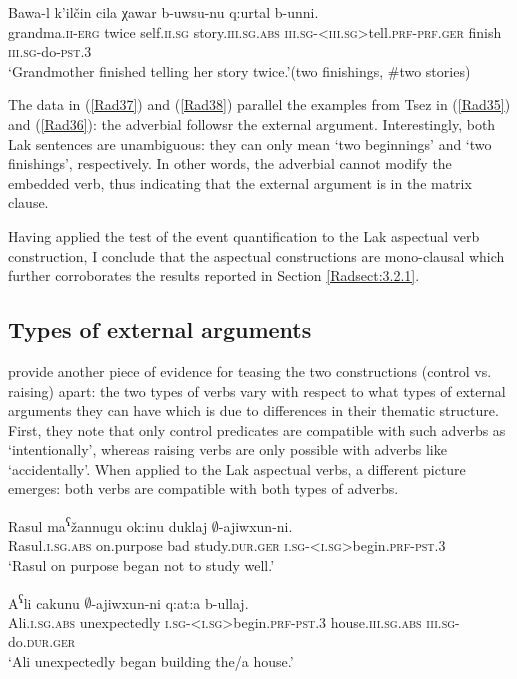 \documentclass[output=paper]{langscibook}
\begin{document}
\newpage
\ea\label{Rad38}
\gll Bawa-l k’ilčin cila χawar b-uwsu-nu q:urtal b-unni.\\
grandma.\textsc{ii-erg} twice self.\textsc{ii.sg} story.\textsc{iii.sg.abs} \textsc{iii.sg-<iii.sg>}tell.\textsc{prf-prf.ger} finish 	\textsc{iii.sg}-do-\textsc{pst.3}\\
\glt ‘Grandmother finished telling her story twice.’(two finishings, \#two stories)\\
\z 

The data in (\ref{Rad37}) and (\ref{Rad38}) parallel the examples from Tsez in (\ref{Rad35}) and (\ref{Rad36}): the adverbial followsr the external argument.  Interestingly, both Lak sentences are unambiguous: they can only mean ‘two beginnings’ and ‘two finishings’, respectively. In other words, the adverbial cannot modify the embedded verb, thus indicating that the external argument is in the matrix clause. 

Having applied the test of the event quantification to the Lak aspectual verb construction, I conclude that the aspectual constructions are mono-clausal which further corroborates the results reported in Section \ref{Radsect:3.2.1}.

\subsection{Types of external arguments}
\citet{PolinskyPotsdam2002}  provide another piece of evidence for teasing the two constructions (control vs. raising) apart: the two types of verbs vary with respect to what types of external arguments they can have which is due to differences in their thematic structure. First, they note that only control predicates are compatible with such adverbs as ‘intentionally’, whereas raising verbs are only possible with adverbs like ‘accidentally’. When applied to the Lak aspectual verbs, a different picture emerges: both verbs are compatible with both types of adverbs.

\ea\label{Rad41}
\gll Rasul ma\textsuperscript{ʕ}žannugu ok:inu duklaj	$∅$-ajiwxun-ni.\\
Rasul.\textsc{i.sg.abs} on.purpose bad study.\textsc{dur.ger} \textsc{i.sg-<i.sg>}begin.\textsc{prf-pst.3}\\
\glt ‘Rasul on purpose began not to study well.’
\z 

\ea\label{Rad42}
\gll A\textsuperscript{ʕ}li cakunu $∅$-ajiwxun-ni q:at:a b-ullaj.\\
Ali.\textsc{i.sg.abs} unexpectedly \textsc{i.sg-<i.sg>}begin.\textsc{prf-pst.3} house.\textsc{iii.sg.abs} \textsc{iii.sg}-do.\textsc{dur.ger}\\
\glt ‘Ali unexpectedly began building the/a house.’
\z 
\end{document}

